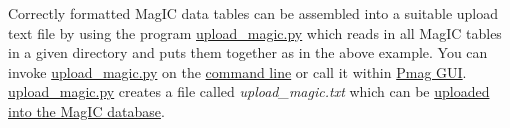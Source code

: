 \documentclass[11pt]{book}
\begin{document}
{{{Correctly formatted MagIC data tables can be assembled into a suitable upload text file by using the program \href{#upload_magic.py}{upload\_magic.py} which reads in all MagIC tables in a given directory and puts them together as in the above example.  You can invoke \href{#upload_magic.py}{upload\_magic.py} on the \href{#command_line}{command line} or call it within  \href{#pmag_gui.py}{Pmag GUI}.     \href{#upload_magic.py}{upload\_magic.py} creates a file called {\it upload\_magic.txt} which can be \href{#magic_upload}{uploaded into the MagIC database}.



%
%
%
%
%
%
%
%
%
%
%
%
%
%
%
%
%
%





}}}
\end{document}
